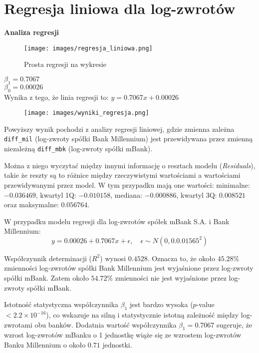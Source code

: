 \documentclass[12pt]{article}
\begin{document}
\clearpage

\section{Regresja liniowa dla log-zwrotów}

{\bf \large Analiza regresji}

\begin{figure}[h]
    \centering
    \texttt{[image: images/regresja\_liniowa.png]}
    \caption{Prosta regresji na wykresie}
\end{figure}
$\beta_1 = 0.7067$ \\
$\beta_0 = 0.00026$
\\
Wynika z tego, że linia regresji to: $ y = 0.7067x + 0.00026$ 
\vspace{0.5 cm}
\begin{figure}[h]
    \centering
    \texttt{[image: images/wyniki\_regresja.png]}
\end{figure}

\clearpage

Powyższy wynik pochodzi z analizy regresji liniowej, gdzie zmienna zależna \texttt{diff\_mil} (log-zwroty spółki Bank Millennium) jest przewidywana przez zmienną niezależną \texttt{diff\_mbk} (log-zwroty spółki mBank).

Można z niego wyczytać między innymi informację o resztach modelu (\textit{Residuals}), takie że reszty są to różnice między rzeczywistymi wartościami a wartościami przewidywanymi przez model. W tym przypadku mają one wartości: minimalne: $-0.036469$, kwartyl 1Q: $-0.010158$, mediana: $-0.000886$, kwartyl 3Q: $0.008521$ oraz maksymalne: $0.056764$.

W przypadku modelu regresji dla log-zwrotów spółek mBank S.A. i Bank Millennium:
\begin{equation}
y = 0.00026 + 0.7067x + \epsilon, \quad \epsilon \sim N(0, 0.0.01565^2)
\end{equation}

Współczynnik determinacji ($R^2$) wynosi $0.4528$. Oznacza to, że około $45.28\%$ zmienności log-zwrotów spółki Bank Millennium jest wyjaśnione przez log-zwroty spółki mBank. Zatem około $54.72\%$ zmienności nie jest wyjaśnione przez log-zwroty spółki mBank.

Istotność statystyczna współczynnika $\beta_1$ jest bardzo wysoka ($p$-value $< 2.2 \times 10^{-16}$), co wskazuje na silną i statystycznie istotną zależność między log-zwrotami obu banków. Dodatnia wartość współczynnika $\beta_1 = 0.7067$ sugeruje, że wzrost log-zwrotów mBanku o 1 jednostkę wiąże się ze wzrostem log-zwrotów Banku Millennium o około $0.71$ jednostki.
\end{document}
